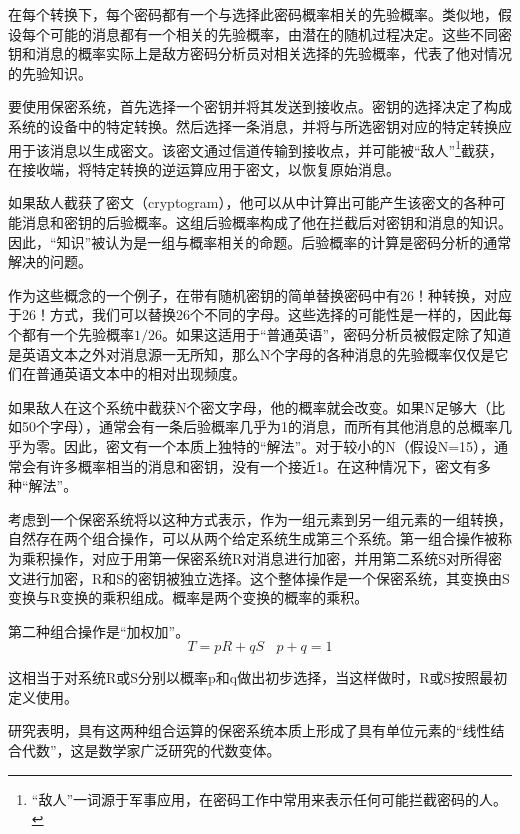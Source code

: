 \documentclass[]{article}
\begin{document}
在每个转换下，每个密码都有一个与选择此密码概率相关的先验概率。类似地，假设每个可能的消息都有一个相关的先验概率，由潜在的随机过程决定。这些不同密钥和消息的概率实际上是敌方密码分析员对相关选择的先验概率，代表了他对情况的先验知识。\par

要使用保密系统，首先选择一个密钥并将其发送到接收点。密钥的选择决定了构成系统的设备中的特定转换。然后选择一条消息，并将与所选密钥对应的特定转换应用于该消息以生成密文。该密文通过信道传输到接收点，并可能被“敌人”\footnote{“敌人”一词源于军事应用，在密码工作中常用来表示任何可能拦截密码的人。}截获，在接收端，将特定转换的逆运算应用于密文，以恢复原始消息。\par

如果敌人截获了密文（cryptogram），他可以从中计算出可能产生该密文的各种可能消息和密钥的后验概率。这组后验概率构成了他在拦截后对密钥和消息的知识。因此，“知识”被认为是一组与概率相关的命题。后验概率的计算是密码分析的通常解决的问题。
\par

作为这些概念的一个例子，在带有随机密钥的简单替换密码中有26！种转换，对应于26！方式，我们可以替换26个不同的字母。这些选择的可能性是一样的，因此每个都有一个先验概率$1/26$。如果这适用于“普通英语”，密码分析员被假定除了知道是英语文本之外对消息源一无所知，那么N个字母的各种消息的先验概率仅仅是它们在普通英语文本中的相对出现频度。\par

如果敌人在这个系统中截获N个密文字母，他的概率就会改变。如果N足够大（比如50个字母），通常会有一条后验概率几乎为1的消息，而所有其他消息的总概率几乎为零。因此，密文有一个本质上独特的“解法”。对于较小的N（假设N=15），通常会有许多概率相当的消息和密钥，没有一个接近1。在这种情况下，密文有多种“解法”。\par

考虑到一个保密系统将以这种方式表示，作为一组元素到另一组元素的一组转换，自然存在两个组合操作，可以从两个给定系统生成第三个系统。第一组合操作被称为乘积操作，对应于用第一保密系统R对消息进行加密，并用第二系统S对所得密文进行加密，R和S的密钥被独立选择。这个整体操作是一个保密系统，其变换由S变换与R变换的乘积组成。概率是两个变换的概率的乘积。\par

第二种组合操作是“加权加”。\[T=pR+qS \ \ \ \  p+q=1\]

这相当于对系统R或S分别以概率p和q做出初步选择，当这样做时，R或S按照最初定义使用。


研究表明，具有这两种组合运算的保密系统本质上形成了具有单位元素的“线性结合代数”，这是数学家广泛研究的代数变体。
\end{document}
